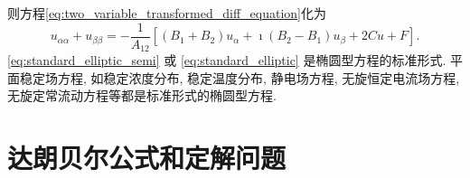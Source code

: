 \begin{enumerate}
则方程\eqref{eq:two_variable_transformed_diff_equation}化为
\begin{equation}
    u_{\alpha \alpha}+u_{\beta \beta}=-\frac{1}{A_{12}}\left[\left(B_1+B_2\right) u_\alpha+\imath\left(B_2-B_1\right) u_\beta+2 C u+F\right] .
    \label{eq:standard_elliptic}
\end{equation}
\eqref{eq:standard_elliptic_semi} 或 \eqref{eq:standard_elliptic} 是椭圆型方程的标准形式. 
平面稳定场方程, 如稳定浓度分布, 稳定温度分布, 静电场方程, 无旋恒定电流场方程, 无旋定常流动方程等都是标准形式的椭圆型方程.
\end{enumerate}


\section{达朗贝尔公式和定解问题}